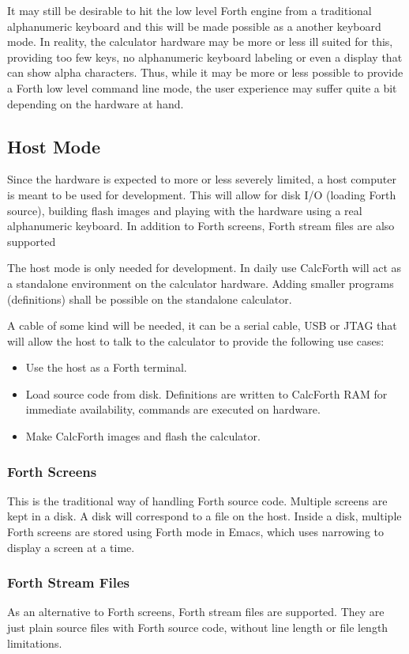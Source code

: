 \documentclass[a4paper]{article}
\begin{document}
It may still be desirable to hit the low level Forth engine from a traditional alphanumeric keyboard and this will be made possible as a another keyboard mode. In reality, the calculator hardware may be more or less ill suited for this, providing too few keys, no alphanumeric keyboard labeling or even a display that can show alpha characters. Thus, while it may be more or less possible to provide a Forth low level command line mode, the user experience may suffer quite a bit depending on the hardware at hand.

\subsection{Host Mode}
Since the hardware is expected to more or less severely limited, a host computer is meant to be used for development. This will allow for disk I/O (loading Forth source), building flash images and playing with the hardware using a real alphanumeric keyboard. In addition to Forth screens, Forth stream files are also supported

The host mode is only needed for development. In daily use CalcForth will act as a standalone environment on the calculator hardware. Adding smaller programs (definitions) shall be possible on the standalone calculator.

A cable of some kind will be needed, it can be a serial cable, USB or JTAG that will allow the host to talk to the calculator to provide the following use cases:
\begin{itemize}
\item Use the host as a Forth terminal.
\item Load source code from disk. Definitions are written to CalcForth RAM for immediate availability, commands are executed on hardware.
\item Make CalcForth images and flash the calculator.
\end{itemize}

\subsubsection{Forth Screens}
This is the traditional way of handling Forth source code.
Multiple screens are kept in a disk. A disk will correspond to a file on the host. Inside a disk, multiple Forth screens are stored using Forth mode in Emacs, which uses narrowing to display a screen at a time.

\subsubsection{Forth Stream Files}
As an alternative to Forth screens, Forth stream files are supported. They are just plain source files with Forth source code, without line length or file length limitations.
\end{document}
